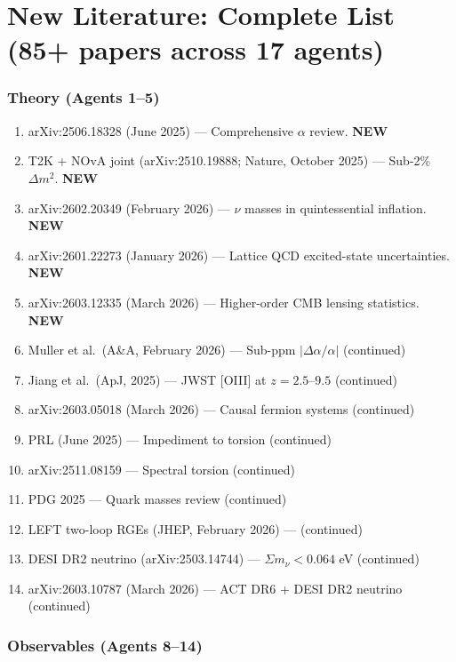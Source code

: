 \documentclass[11pt,a4paper]{article}
\newcommand{\NEW}{\textcolor{dfdblue}{\textbf{NEW}}}
\begin{document}
\part{New Literature: Complete List (85+ papers across 17 agents)}

\section{Theory (Agents 1--5)}

\begin{enumerate}
\item arXiv:2506.18328 (June 2025) --- Comprehensive $\alpha$ review. \NEW
\item T2K + NOvA joint (arXiv:2510.19888; Nature, October 2025) --- Sub-2\% $\Delta m^2$. \NEW
\item arXiv:2602.20349 (February 2026) --- $\nu$ masses in quintessential inflation. \NEW
\item arXiv:2601.22273 (January 2026) --- Lattice QCD excited-state uncertainties. \NEW
\item arXiv:2603.12335 (March 2026) --- Higher-order CMB lensing statistics. \NEW
\item Muller et al.\ (A\&A, February 2026) --- Sub-ppm $|\Delta\alpha/\alpha|$ (continued)
\item Jiang et al.\ (ApJ, 2025) --- JWST [OIII] at $z = 2.5$--$9.5$ (continued)
\item arXiv:2603.05018 (March 2026) --- Causal fermion systems (continued)
\item PRL (June 2025) --- Impediment to torsion (continued)
\item arXiv:2511.08159 --- Spectral torsion (continued)
\item PDG 2025 --- Quark masses review (continued)
\item LEFT two-loop RGEs (JHEP, February 2026) --- (continued)
\item DESI DR2 neutrino (arXiv:2503.14744) --- $\Sigma m_\nu < 0.064$ eV (continued)
\item arXiv:2603.10787 (March 2026) --- ACT DR6 + DESI DR2 neutrino (continued)
\end{enumerate}

\section{Observables (Agents 8--14)}
\end{document}
